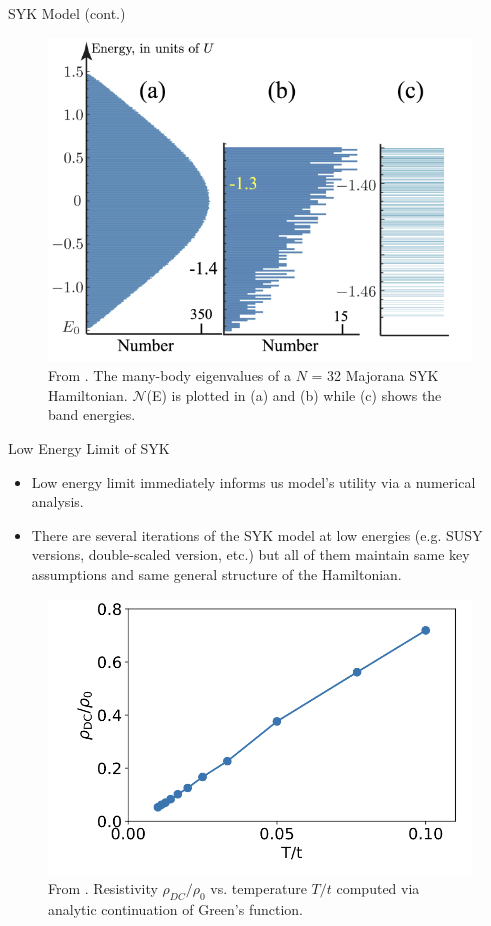\documentclass{beamer}
\begin{document}
\begin{frame}{SYK Model (cont.)}
\begin{figure}
    \centering
    \includegraphics[scale = 0.6]{SYK Spectrum.png}
    \caption{From \cite{Chowdhury_2022}. The many-body eigenvalues of a $N$ = 32 Majorana SYK Hamiltonian. $\mathcal{N}$(E) is plotted in (a) and (b) while (c) shows the band energies.}
    \label{fig:enter-label}
\end{figure}
    
\end{frame}
\begin{frame}{Low Energy Limit of SYK}
\begin{itemize}
    \item Low energy limit immediately informs us model's utility via a numerical analysis.
    \item There are several iterations of the SYK model at low energies (e.g. SUSY versions, double-scaled version, etc.) but all of them maintain same key assumptions and same general structure of the Hamiltonian.
\end{itemize}
\begin{figure}
    \centering
    \includegraphics[scale = 0.4]{SYKLinear.png}
    \caption{From \cite{Cha_2020}. Resistivity $\rho_{DC}/\rho_{0}$ vs. temperature $T/t$ computed via analytic continuation of Green's function.}
    \label{fig:enter-label}
\end{figure}


\end{frame}
\end{document}
